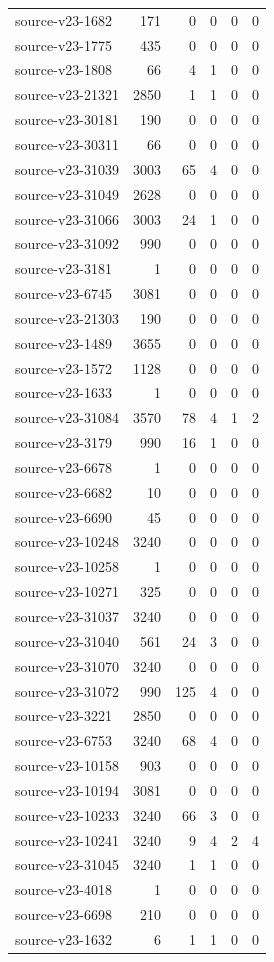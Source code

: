 \begin{longtable}{p{}rrrrr}
source-v23-1682 & 171 & 0 & 0 & 0 & 0\\
source-v23-1775 & 435 & 0 & 0 & 0 & 0\\
source-v23-1808 & 66 & 4 & 1 & 0 & 0\\
source-v23-21321 & 2850 & 1 & 1 & 0 & 0\\
source-v23-30181 & 190 & 0 & 0 & 0 & 0\\
source-v23-30311 & 66 & 0 & 0 & 0 & 0\\
source-v23-31039 & 3003 & 65 & 4 & 0 & 0\\
source-v23-31049 & 2628 & 0 & 0 & 0 & 0\\
source-v23-31066 & 3003 & 24 & 1 & 0 & 0\\
source-v23-31092 & 990 & 0 & 0 & 0 & 0\\
source-v23-3181 & 1 & 0 & 0 & 0 & 0\\
source-v23-6745 & 3081 & 0 & 0 & 0 & 0\\
source-v23-21303 & 190 & 0 & 0 & 0 & 0\\
source-v23-1489 & 3655 & 0 & 0 & 0 & 0\\
source-v23-1572 & 1128 & 0 & 0 & 0 & 0\\
source-v23-1633 & 1 & 0 & 0 & 0 & 0\\
source-v23-31084 & 3570 & 78 & 4 & 1 & 2\\
source-v23-3179 & 990 & 16 & 1 & 0 & 0\\
source-v23-6678 & 1 & 0 & 0 & 0 & 0\\
source-v23-6682 & 10 & 0 & 0 & 0 & 0\\
source-v23-6690 & 45 & 0 & 0 & 0 & 0\\
source-v23-10248 & 3240 & 0 & 0 & 0 & 0\\
source-v23-10258 & 1 & 0 & 0 & 0 & 0\\
source-v23-10271 & 325 & 0 & 0 & 0 & 0\\
source-v23-31037 & 3240 & 0 & 0 & 0 & 0\\
source-v23-31040 & 561 & 24 & 3 & 0 & 0\\
source-v23-31070 & 3240 & 0 & 0 & 0 & 0\\
source-v23-31072 & 990 & 125 & 4 & 0 & 0\\
source-v23-3221 & 2850 & 0 & 0 & 0 & 0\\
source-v23-6753 & 3240 & 68 & 4 & 0 & 0\\
source-v23-10158 & 903 & 0 & 0 & 0 & 0\\
source-v23-10194 & 3081 & 0 & 0 & 0 & 0\\
source-v23-10233 & 3240 & 66 & 3 & 0 & 0\\
source-v23-10241 & 3240 & 9 & 4 & 2 & 4\\
source-v23-31045 & 3240 & 1 & 1 & 0 & 0\\
source-v23-4018 & 1 & 0 & 0 & 0 & 0\\
source-v23-6698 & 210 & 0 & 0 & 0 & 0\\
source-v23-1632 & 6 & 1 & 1 & 0 & 0\\
\end{longtable}
